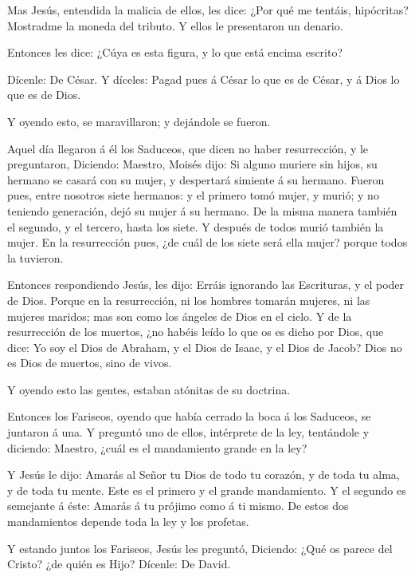  Mas Jesús, entendida la malicia de ellos, les dice: ¿Por
qué me tentáis, hipócritas?  Mostradme la moneda del
tributo. Y ellos le presentaron un denario.

 Entonces les dice: ¿Cúya es esta figura, y lo que está
encima escrito?

 Dícenle: De César. Y díceles: Pagad pues á César lo que es
de César, y á Dios lo que es de Dios.

 Y oyendo esto, se maravillaron; y dejándole se fueron.

 Aquel día llegaron á él los Saduceos, que dicen no haber
resurrección, y le preguntaron,  Diciendo: Maestro, Moisés
dijo: Si alguno muriere sin hijos, su hermano se casará con su mujer, y
despertará simiente á su hermano.  Fueron pues, entre
nosotros siete hermanos: y el primero tomó mujer, y murió; y no teniendo
generación, dejó su mujer á su hermano.  De la misma manera
también el segundo, y el tercero, hasta los siete.  Y
después de todos murió también la mujer.  En la
resurrección pues, ¿de cuál de los siete será ella mujer? porque todos
la tuvieron.

 Entonces respondiendo Jesús, les dijo: Erráis ignorando
las Escrituras, y el poder de Dios.  Porque en la
resurrección, ni los hombres tomarán mujeres, ni las mujeres maridos;
mas son como los ángeles de Dios en el cielo.  Y de la
resurrección de los muertos, ¿no habéis leído lo que os es dicho por
Dios, que dice:  Yo soy el Dios de Abraham, y el Dios de
Isaac, y el Dios de Jacob? Dios no es Dios de muertos, sino de vivos.

 Y oyendo esto las gentes, estaban atónitas de su doctrina.

 Entonces los Fariseos, oyendo que había cerrado la boca á
los Saduceos, se juntaron á una.  Y preguntó uno de ellos,
intérprete de la ley, tentándole y diciendo:  Maestro,
¿cuál es el mandamiento grande en la ley?

 Y Jesús le dijo: Amarás al Señor tu Dios de todo tu
corazón, y de toda tu alma, y de toda tu mente.  Este es el
primero y el grande mandamiento.  Y el segundo es semejante
á éste: Amarás á tu prójimo como á ti mismo.  De estos dos
mandamientos depende toda la ley y los profetas.

 Y estando juntos los Fariseos, Jesús les preguntó,
 Diciendo: ¿Qué os parece del Cristo? ¿de quién es Hijo?
Dícenle: De David.

